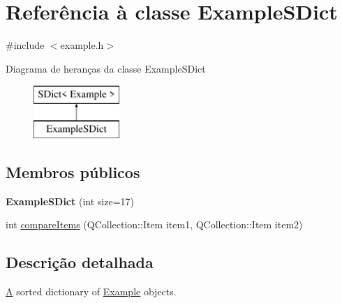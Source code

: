 \hypertarget{class_example_s_dict}{\section{Referência à classe Example\-S\-Dict}
\label{class_example_s_dict}
}


{\ttfamily \#include $<$example.\-h$>$}

Diagrama de heranças da classe Example\-S\-Dict\begin{figure}[H]
\begin{center}
\leavevmode
\includegraphics[height=2.000000cm]{class_example_s_dict}
\end{center}
\end{figure}
\subsection*{Membros públicos}
\begin{DoxyCompactItemize}
\item 
\hypertarget{class_example_s_dict_adaab059dc945b320583cd8de94cb81b2}{{\bfseries Example\-S\-Dict} (int size=17)}\label{class_example_s_dict_adaab059dc945b320583cd8de94cb81b2}

\item 
int \hyperlink{class_example_s_dict_a219450accf048597ffc7113ecde4c402}{compare\-Items} (Q\-Collection\-::\-Item item1, Q\-Collection\-::\-Item item2)
\end{DoxyCompactItemize}


\subsection{Descrição detalhada}
\hyperlink{class_a}{A} sorted dictionary of \hyperlink{struct_example}{Example} objects. 


